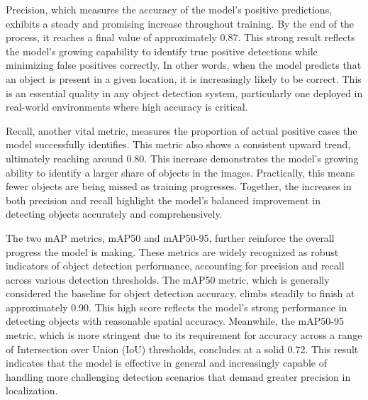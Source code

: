 \documentclass[conference]{IEEEtran}
\begin{document}
Precision, which measures the accuracy of the model’s positive predictions, exhibits a steady and promising increase throughout training. By the end of the process, it reaches a final value of approximately 0.87. This strong result reflects the model's growing capability to identify true positive detections while minimizing false positives correctly. In other words, when the model predicts that an object is present in a given location, it is increasingly likely to be correct. This is an essential quality in any object detection system, particularly one deployed in real-world environments where high accuracy is critical.

Recall, another vital metric, measures the proportion of actual positive cases the model successfully identifies. This metric also shows a consistent upward trend, ultimately reaching around 0.80. This increase demonstrates the model’s growing ability to identify a larger share of objects in the images. Practically, this means fewer objects are being missed as training progresses. Together, the increases in both precision and recall highlight the model’s balanced improvement in detecting objects accurately and comprehensively.

The two mAP metrics, mAP50 and mAP50-95, further reinforce the overall progress the model is making. These metrics are widely recognized as robust indicators of object detection performance, accounting for precision and recall across various detection thresholds. The mAP50 metric, which is generally considered the baseline for object detection accuracy, climbs steadily to finish at approximately 0.90. This high score reflects the model’s strong performance in detecting objects with reasonable spatial accuracy. Meanwhile, the mAP50-95 metric, which is more stringent due to its requirement for accuracy across a range of Intersection over Union (IoU) thresholds, concludes at a solid 0.72. This result indicates that the model is effective in general and increasingly capable of handling more challenging detection scenarios that demand greater precision in localization.
\end{document}
